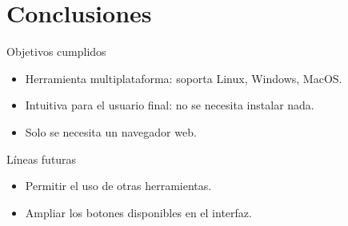 \documentclass{beamer}
\begin{document}
\section{Conclusiones}
\begin{frame}
\begin{block}{Objetivos cumplidos}
\begin{itemize}
\item Herramienta multiplataforma: soporta Linux, Windows, MacOS.
\item Intuitiva para el usuario final: no se necesita instalar nada.
\item Solo se necesita un navegador web.
\end{itemize}
\end{block}

\begin{block}{Líneas futuras}
\begin{itemize}
\item Permitir el uso de otras herramientas.
\item Ampliar los botones disponibles en el interfaz.
\end{itemize}
\end{block}
\end{frame}

\begin{frame}[plain]
\large{\titlepage}
\end{frame}
\end{document}
